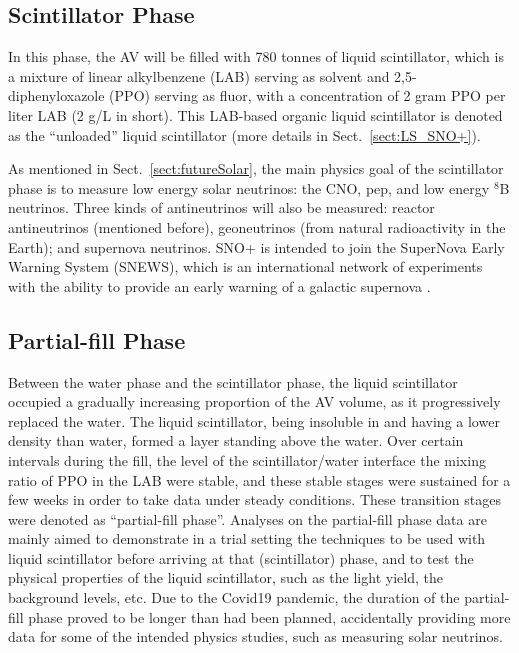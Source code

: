 \subsection{Scintillator Phase} \label{sect:scintPhase}

In this phase, the AV will be filled with 780 tonnes of liquid scintillator, which is a mixture of linear alkylbenzene (LAB) serving as solvent and 2,5-diphenyloxazole (PPO) serving as fluor, with a concentration of 2 gram PPO per liter LAB (2 g/L in short). This LAB-based organic liquid scintillator is denoted as the ``unloaded'' liquid scintillator (more details in Sect.~\ref{sect:LS_SNO+}).

As mentioned in Sect.~\ref{sect:futureSolar}, the main physics goal of the scintillator phase is to measure low energy solar neutrinos: the CNO, pep, and low energy $^8$B neutrinos. Three kinds of antineutrinos will also be measured: reactor antineutrinos (mentioned before), geoneutrinos (from natural radioactivity in the Earth); and supernova neutrinos. SNO+ is intended to join the SuperNova Early Warning System (SNEWS), which is an international network of experiments with the ability to provide an early warning of a galactic supernova \cite{snop_jinst}.

\subsection{Partial-fill Phase} \label{sect:partialPhase}

Between the water phase and the scintillator phase, the liquid scintillator occupied a gradually increasing proportion of the AV volume, as it progressively replaced the water. The liquid scintillator, being insoluble in and having a lower density than water, formed a layer standing above the water. Over certain intervals during the fill, the level of the scintillator/water interface the mixing ratio of PPO in the LAB were stable, and these stable stages were sustained for a few weeks in order to take data under steady conditions. These transition stages were denoted as ``partial-fill phase''. Analyses on the partial-fill phase data are mainly aimed to demonstrate in a trial setting the techniques to be used with liquid scintillator before arriving at that (scintillator) phase, and to test the physical properties of the liquid scintillator, such as the light yield, the background levels, etc. Due to the Covid19 pandemic, the duration of the partial-fill phase proved to be longer than had been planned, accidentally providing more data for some of the intended physics studies, such as measuring solar neutrinos.

